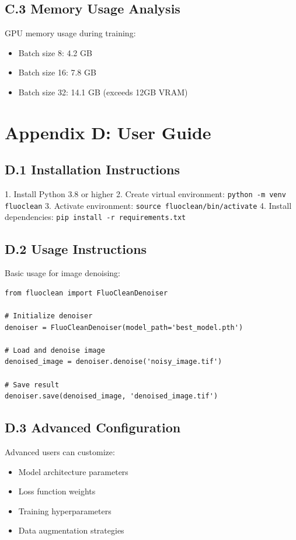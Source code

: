 \documentclass[12pt,a4paper]{report}
\begin{document}
\subsection*{C.3 Memory Usage Analysis}

GPU memory usage during training:
\begin{itemize}
    \item Batch size 8: 4.2 GB
    \item Batch size 16: 7.8 GB
    \item Batch size 32: 14.1 GB (exceeds 12GB VRAM)
\end{itemize}

\section*{Appendix D: User Guide}

\subsection*{D.1 Installation Instructions}

1. Install Python 3.8 or higher
2. Create virtual environment: \texttt{python -m venv fluoclean}
3. Activate environment: \texttt{source fluoclean/bin/activate}
4. Install dependencies: \texttt{pip install -r requirements.txt}

\subsection*{D.2 Usage Instructions}

Basic usage for image denoising:

\begin{verbatim}
from fluoclean import FluoCleanDenoiser

# Initialize denoiser
denoiser = FluoCleanDenoiser(model_path='best_model.pth')

# Load and denoise image
denoised_image = denoiser.denoise('noisy_image.tif')

# Save result
denoiser.save(denoised_image, 'denoised_image.tif')
\end{verbatim}

\subsection*{D.3 Advanced Configuration}

Advanced users can customize:
\begin{itemize}
    \item Model architecture parameters
    \item Loss function weights
    \item Training hyperparameters
    \item Data augmentation strategies
\end{itemize}
\end{document}
